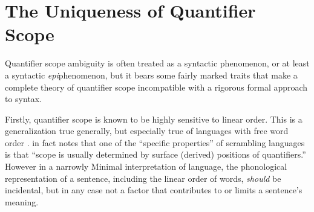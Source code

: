 \documentclass{article}
\begin{document}










\section{The Uniqueness of Quantifier Scope}

Quantifier scope ambiguity is often treated as a syntactic phenomenon, or at least a syntactic \emph{epi}phenomenon, but it bears some fairly marked traits that make a complete theory of quantifier scope incompatible with a rigorous formal approach to syntax.

Firstly, quantifier scope is known to be highly sensitive to linear order.
This is a generalization true generally, but especially true of languages with free word order
\parencite{pafel04}.
\textcite[xix]{karimi03} in fact notes that one of the ``specific properties'' of scrambling languages is that ``scope is usually determined by surface (derived) positions of quantifiers.''
However in a narrowly Minimal interpretation of language, the phonological representation of a sentence, including the linear order of words, \emph{should} be incidental, but in any case not a factor that contributes to or limits a sentence's meaning.
\end{document}

